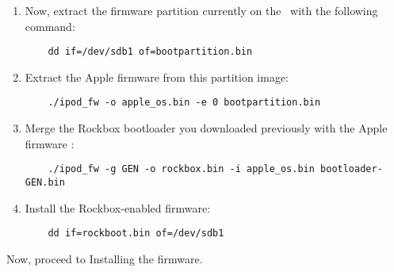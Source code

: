 \begin{enumerate}
  \item Now, extract the firmware partition currently on the \dap\ with the
    following command:
    \begin{verbatim}
    dd if=/dev/sdb1 of=bootpartition.bin
    \end{verbatim}
  \item Extract the Apple firmware from this partition image:
    \begin{verbatim}
    ./ipod_fw -o apple_os.bin -e 0 bootpartition.bin
    \end{verbatim}

  \item Merge the Rockbox bootloader you downloaded previously with the Apple
    firmware :
    \begin{verbatim}
    ./ipod_fw -g GEN -o rockbox.bin -i apple_os.bin bootloader-GEN.bin
    \end{verbatim}
  \item
    Install the Rockbox-enabled firmware:
    \begin{verbatim}
    dd if=rockboot.bin of=/dev/sdb1
    \end{verbatim}
\end{enumerate}

Now, proceed to  Installing the firmware.
